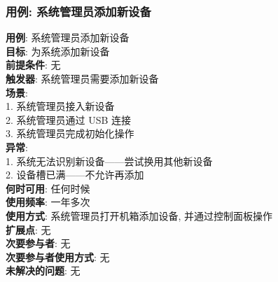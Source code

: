 \documentclass[UTF8]{article}
\begin{document}
\subsubsection{用例: 系统管理员添加新设备}
\noindent
\textbf{用例}: 系统管理员添加新设备
\\
\textbf{目标}: 为系统添加新设备
\\
\textbf{前提条件}: 无
\\
\textbf{触发器}: 系统管理员需要添加新设备
\\
\textbf{场景}: \\
	\hspace*{2em} 1. 系统管理员接入新设备 \\
	\hspace*{2em} 2. 系统管理员通过 USB 连接 \\
	\hspace*{2em} 3. 系统管理员完成初始化操作 \\
	
\textbf{异常}: \\
	\hspace*{2em} 1. 系统无法识别新设备——尝试换用其他新设备 \\
	\hspace*{2em} 2. 设备槽已满——不允许再添加 \\
\textbf{何时可用}: 任何时候 \\
\textbf{使用频率}: 一年多次 \\
\textbf{使用方式}: 系统管理员打开机箱添加设备, 并通过控制面板操作 \\
\textbf{扩展点}: 无 \\
\textbf{次要参与者}: 无 \\
\textbf{次要参与者使用方式}: 无 \\
\textbf{未解决的问题}: 无 \\
	
\end{document}
